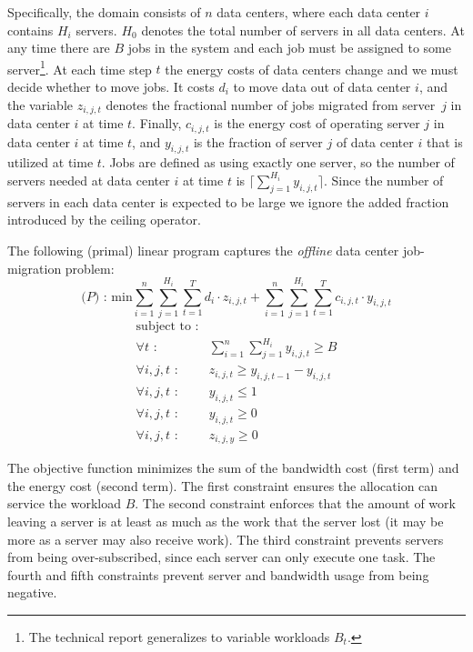 Specifically, the domain consists of $n$ data centers, where each data center $i$ contains $H_i$ servers.
$H_0$ denotes the total number of servers in all data centers.
At any time there are $B$ jobs in the system and each job must be assigned to some server\footnote{The technical report generalizes to variable workloads $B_{t}$.}.
At each time step $t$ the energy costs of data centers change and we must decide whether to move jobs. 
It costs $d_i$ to move data out of data center $i$, and the variable $z_{i,j,t}$ denotes the fractional number of jobs migrated from server~$j$ in data center $i$ at time $t$.
Finally, $c_{i,j,t}$ is the energy cost of operating server $j$ in data center $i$ at time $t$, and $y_{i,j,t}$ is the fraction of server $j$ of data center $i$ that is utilized at time $t$.
Jobs are defined as using exactly one server, so the number of servers needed at data center $i$ at time $t$ is $\lceil \sum^{H_i}_{j=1}y_{i,j,t} \rceil$.
Since the number of servers in each data center is expected to be large we ignore the added fraction introduced by the ceiling operator.

The following (primal) linear program captures the \emph{offline} data center job-migration problem:
\[
\textrm{($P$) : min}  \sum^n_{i=1}\sum^{H_i}_{j=1}\sum^{T}_{t=1}d_{i} \cdot z_{i,j,t} + \sum^{n}_{i=1}\sum^{H_{i}}_{j=1}\sum^{T}_{t=1} c_{i,j,t} \cdot y_{i,j,t}
\]
\[
	\begin{array}{lr}
	\textrm{subject to :} & \\
		\forall t \textrm{ :} & \sum^n_{i=1}\sum^{H_i}_{j=1}y_{i,j,t} \geq B \\
		\forall i,j,t \textrm{ :}	    & z_{i,j,t} \geq y_{i,j,t-1} - y_{i,j,t} \\
		\forall i,j,t \textrm{ :}	    & y_{i,j,t} \leq 1 \\
		\forall i,j,t \textrm{ :}	    & y_{i,j,t} \geq 0 \\
		\forall i,j,t \textrm{ :}	    & z_{i,j,y} \geq 0
	\end{array}
\]

The objective function minimizes the sum of the bandwidth cost (first term) and the energy cost (second term).
The first constraint ensures the allocation can service the workload $B$.
The second constraint enforces that the amount of work leaving a server is at least as much as the work that the server lost (it may be more as a server may also receive work).
The third constraint prevents servers from being over-subscribed, since each server can only execute one task. 
The fourth and fifth constraints prevent server and bandwidth usage from being negative.

